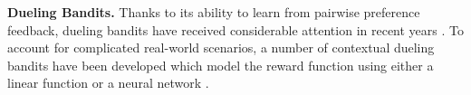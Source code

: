 \textbf{Dueling Bandits.}
Thanks to its ability to learn from pairwise preference feedback, dueling bandits have received considerable attention in recent years
\citep{ICML09_yue2009interactively,ICML11_yue2011beat,JCSS12_yue2012k,WSDM14_zoghi2014relative,ICML14_ailon2014reducing,ICML14_zoghi2014relative,COLT15_komiyama2015regret,ICML15_gajane2015relative,UAI18_saha2018battle,AISTATS19_saha2019active,ALT19_saha2019pac,AISTATS22_saha2022exploiting,ICML23_zhu2023principled}. 
To account for complicated real-world scenarios, a number of contextual dueling bandits have been developed which model the reward function using either a linear function
\citep{NeurIPS21_saha2021optimal,ICML22_bengs2022stochastic,arXiv24_li2024feelgood,ALT22_saha2022efficient,arXiv23_di2023variance} or a neural network \cite{verma2024neural}.

\vspace{-1.2mm}